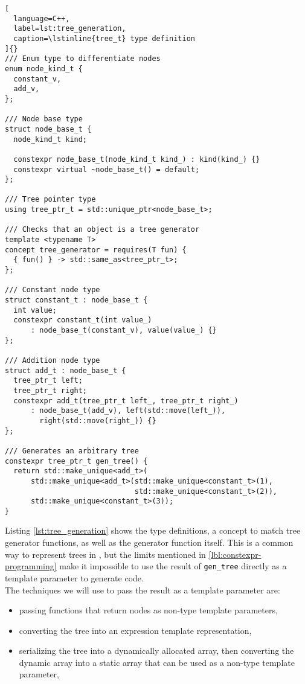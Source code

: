 \documentclass[../main]{subfiles}
\begin{document}
\begin{lstlisting}[
  language=C++,
  label=lst:tree_generation,
  caption=\lstinline{tree_t} type definition
]{}
/// Enum type to differentiate nodes
enum node_kind_t {
  constant_v,
  add_v,
};

/// Node base type
struct node_base_t {
  node_kind_t kind;

  constexpr node_base_t(node_kind_t kind_) : kind(kind_) {}
  constexpr virtual ~node_base_t() = default;
};

/// Tree pointer type
using tree_ptr_t = std::unique_ptr<node_base_t>;

/// Checks that an object is a tree generator
template <typename T>
concept tree_generator = requires(T fun) {
  { fun() } -> std::same_as<tree_ptr_t>;
};

/// Constant node type
struct constant_t : node_base_t {
  int value;
  constexpr constant_t(int value_)
      : node_base_t(constant_v), value(value_) {}
};

/// Addition node type
struct add_t : node_base_t {
  tree_ptr_t left;
  tree_ptr_t right;
  constexpr add_t(tree_ptr_t left_, tree_ptr_t right_)
      : node_base_t(add_v), left(std::move(left_)),
        right(std::move(right_)) {}
};

/// Generates an arbitrary tree
constexpr tree_ptr_t gen_tree() {
  return std::make_unique<add_t>(
      std::make_unique<add_t>(std::make_unique<constant_t>(1),
                              std::make_unique<constant_t>(2)),
      std::make_unique<constant_t>(3));
}
\end{lstlisting}

Listing \ref{lst:tree_generation} shows the type definitions, a concept to
match tree generator functions, as well as the generator function itself.
This is a common way to represent trees in \cpp, but the limits mentioned in
\ref{lbl:constexpr-programming} make it impossible to use the result of
\lstinline{gen_tree} directly as a template parameter to generate code.
\\

The techniques we will use to pass the result as a template parameter are:

\begin{itemize}
\item passing functions that return nodes as non-type template parameters,
\item converting the tree into an expression template representation,
\item serializing the tree into a dynamically allocated array,
      then converting the dynamic array into a static array that can be used as
      a non-type template parameter,
\end{itemize}
\end{document}
